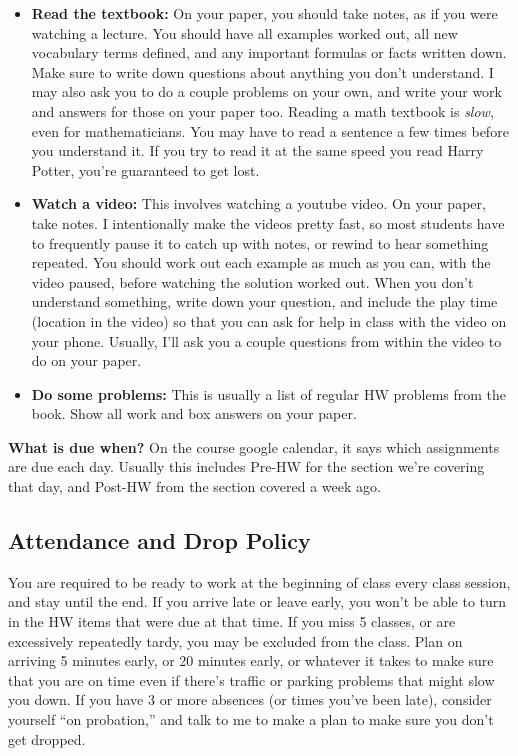 \documentclass[12pt, twoside]{article}
\begin{document}
   \begin{itemize}
      \item \textbf{Read the textbook:} On your paper, you should take notes, as if you were watching a lecture. You should have all examples worked out, all new vocabulary terms defined, and any important formulas or facts written down. Make sure to write down questions about anything you don't understand. I may also ask you to do a couple problems on your own, and write your work and answers for those on your paper too. Reading a math textbook is \emph{slow}, even for mathematicians. You may have to read a sentence a few times before you understand it. If you try to read it at the same speed you read Harry Potter, you're guaranteed to get lost.
      \item \textbf{Watch a video:} This involves watching a youtube video. On your paper, take notes. I intentionally make the videos pretty fast, so most students have to frequently pause it to catch up with notes, or rewind to hear something repeated. You should work out each example as much as you can, with the video paused, before watching the solution worked out. When you don't understand something, write down your question, and include the play time (location in the video) so that you can ask for help in class with the video on your phone. Usually, I'll ask you a couple questions from within the video to do on your paper.
      \item \textbf{Do some problems:} This is usually a list of regular HW problems from the book. Show all work and box answers on your paper. 
   \end{itemize}
   
   \noindent\textbf{What is due when?} On the course google calendar, it says which assignments are due each day. Usually this includes Pre-HW for the section we're covering that day, and Post-HW from the section covered a week ago.

\subsection*{Attendance and Drop Policy}   
   You are required to be ready to work at the beginning of class every class session, and stay until the end. If you arrive late or leave early, you won't be able to turn in the HW items that were due at that time. If you miss 5 classes, or are excessively repeatedly tardy, you may be excluded from the class. Plan on arriving 5 minutes early, or 20 minutes early, or whatever it takes to make sure that you are on time even if there’s traffic or parking problems that might slow you down. If you have 3 or more absences (or times you’ve been late), consider yourself “on probation,” and talk to me to make a plan to make sure you don’t get dropped.
\end{document}
